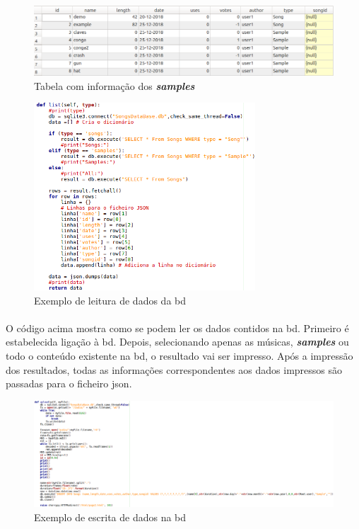 \documentclass[a4paper]{report}
\begin{document}
\begin{figure}[H]
\center
\includegraphics[width=13cm] {imagens/database}
\caption{Tabela com informação dos \textit{\textbf{samples}}}
\end{figure}

\begin{figure}[H]
\center
\includegraphics[height=7cm] {imagens/leiturabd}
\caption{Exemplo de leitura de dados da \ac{bd}}
\end{figure}
\paragraph{}O código acima mostra como se podem ler os dados contidos na \ac{bd}. Primeiro é estabelecida ligação à \ac{bd}. Depois, selecionando apenas as músicas, \textit{\textbf{samples}} ou todo o conteúdo existente na \ac{bd}, o resultado vai ser impresso. Após a impressão dos resultados, todas as informações correspondentes aos dados impressos são passadas para o ficheiro \ac{json}.

\begin{figure}[H]
\center
\includegraphics[width=16.5cm] {imagens/escritabd}
\caption{Exemplo de escrita de dados na \ac{bd}}
\end{figure}
\end{document}
